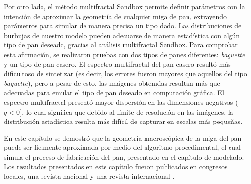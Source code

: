 Por otro lado, el método multifractal Sandbox permite definir parámetros con la intención de aproximar la geometría de cualquier miga de pan, extrayendo parámetros para simular de manera precisa un tipo dado.
Las distribuciones de burbujas de nuestro modelo pueden adecuarse de manera estadística con algún tipo de pan deseado, gracias al análisis multifractal Sandbox.
Para comprobar esta afirmación, se realizaron pruebas con dos tipos de panes diferentes: {\em baguette} y un tipo de pan casero.
El espectro multifractal del pan casero resultó más dificultoso de sintetizar (es decir, los errores fueron mayores que aquellos del tipo {\em baguette}), pero a pesar de esto, las imágenes obtenidas resultan más que adecuadas para emular el tipo de pan deseado en computación gráfica.
El espectro multifractal presentó mayor dispersión en las dimensiones negativas ($q < 0$), 
lo cual significa que debido al límite de resolución en las imágenes, la distribución estadística resulta más difícil de capturar en escalas más pequeñas.

En este capítulo se demostró que la geometría macroscópica de la miga del pan puede ser fielmente aproximada por medio del algoritmo procedimental, el cual simula el proceso de fabricación del pan, presentado en el capítulo de modelado.
Los resultados presentados en este capítulo fueron publicados en congresos locales, una revista nacional y una revista internacional \cite{Baravalle2012, Baravalle2012_2, Baravalle2012_3, Baravalle2015}.



